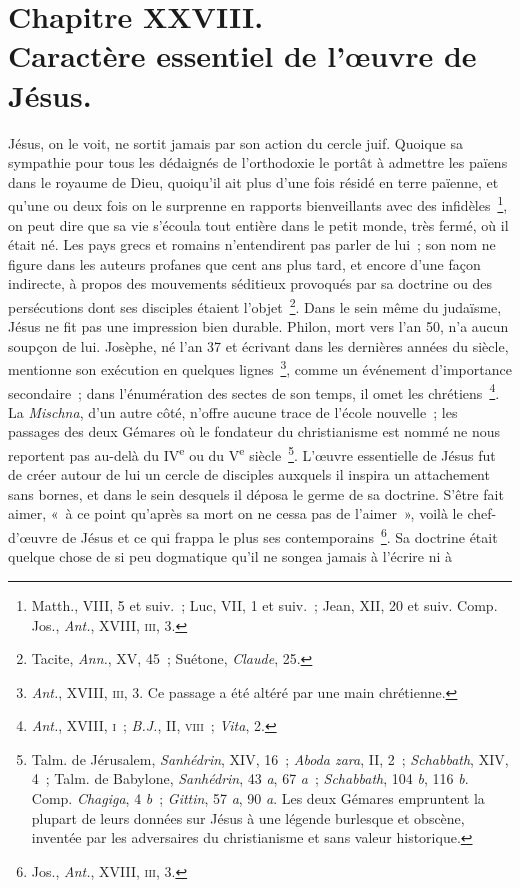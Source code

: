 \documentclass[french,twoside]{book} %
\newcommand\chapteropen{} %
\newcommand\chaptercont{} %
\begin{document}
\chapteropen
\chapter[{Chapitre XXVIII. Caractère essentiel de l’œuvre de Jésus.}]{Chapitre XXVIII.\\
Caractère essentiel de l’œuvre de Jésus.}\renewcommand{\leftmark}{Chapitre XXVIII.\\
Caractère essentiel de l’œuvre de Jésus.}


\chaptercont
\noindent Jésus, on le voit, ne sortit jamais par son action du cercle juif. Quoique sa sympathie pour tous les dédaignés de l’orthodoxie le portât à admettre les païens dans le royaume de Dieu, quoiqu’il ait plus d’une fois résidé en terre païenne, et qu’une ou deux fois on le surprenne en rapports bienveillants avec des infidèles \footnote{ Matth., VIII, 5 et suiv. ; Luc, VII, 1 et suiv. ; Jean, XII, 20 et suiv. Comp. Jos., {\itshape Ant.}, XVIII, \textsc{iii}, 3.}, on peut dire que sa vie s’écoula tout entière dans le petit monde, très fermé, où il était né. Les pays grecs et romains n’entendirent pas parler de lui ; son nom ne figure dans les auteurs profanes que cent ans plus tard, et encore d’une façon indirecte, à propos des mouvements séditieux provoqués par sa doctrine ou des persécutions dont ses disciples étaient l’objet \footnote{ Tacite, {\itshape Ann.}, XV, 45 ; Suétone, {\itshape Claude}, 25.}. Dans le sein même du judaïsme, Jésus ne fit pas une impression bien durable. Philon, mort vers l’an 50, n’a aucun soupçon de lui. Josèphe, né l’an 37 et écrivant dans les dernières années du siècle, mentionne son exécution en quelques lignes \footnote{{\itshape Ant.}, XVIII, \textsc{iii}, 3. Ce passage a été altéré par une main chrétienne.}, comme un événement d’importance secondaire ; dans l’énumération des sectes de son temps, il omet les chrétiens \footnote{{\itshape Ant.}, XVIII, \textsc{i} ; {\itshape B.J.}, II, \textsc{viii} ; {\itshape Vita}, 2.}. La {\itshape Mischna}, d’un autre côté, n’offre aucune trace de l’école nouvelle ; les passages des deux Gémares où le fondateur du christianisme est nommé ne nous reportent pas au-delà du IV\textsuperscript{e} ou du V\textsuperscript{e} siècle \footnote{ Talm. de Jérusalem, {\itshape Sanhédrin}, XIV, 16 ; {\itshape Aboda zara}, II, 2 ; {\itshape Schabbath}, XIV, 4 ; Talm. de Babylone, {\itshape Sanhédrin}, 43 {\itshape a}, 67 {\itshape a} ; {\itshape Schabbath}, 104 {\itshape b}, 116 {\itshape b}. Comp. {\itshape Chagiga}, 4 {\itshape b} ; {\itshape Gittin}, 57 {\itshape a}, 90 {\itshape a}. Les deux Gémares empruntent la plupart de leurs données sur Jésus à une légende burlesque et obscène, inventée par les adversaires du christianisme et sans valeur historique.}. L’œuvre essentielle de Jésus fut de créer autour de lui un cercle de disciples auxquels il inspira un attachement sans bornes, et dans le sein desquels il déposa le germe de sa doctrine. S’être fait aimer, « à ce point qu’après sa mort on ne cessa pas de l’aimer », voilà le chef-d’œuvre de Jésus et ce qui frappa le plus ses contemporains \footnote{ Jos., {\itshape Ant.}, XVIII, \textsc{iii}, 3.}. Sa doctrine était quelque chose de si peu dogmatique qu’il ne songea jamais à l’écrire ni à 
\end{document}
